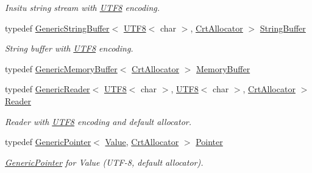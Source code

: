 \begin{DoxyCompactItemize}
\begin{DoxyCompactList}\small\item\em Insitu string stream with \mbox{\hyperlink{structrapidjson_1_1_u_t_f8}{U\+T\+F8}} encoding. \end{DoxyCompactList}\item 
typedef \mbox{\hyperlink{classrapidjson_1_1_generic_string_buffer}{Generic\+String\+Buffer}}$<$ \mbox{\hyperlink{structrapidjson_1_1_u_t_f8}{U\+T\+F8}}$<$ char $>$, \mbox{\hyperlink{classrapidjson_1_1_crt_allocator}{Crt\+Allocator}} $>$ \mbox{\hyperlink{namespacerapidjson_ac0765ea91f41539645c4b78689d03f21}{String\+Buffer}}
\begin{DoxyCompactList}\small\item\em String buffer with \mbox{\hyperlink{structrapidjson_1_1_u_t_f8}{U\+T\+F8}} encoding. \end{DoxyCompactList}\item 
typedef \mbox{\hyperlink{structrapidjson_1_1_generic_memory_buffer}{Generic\+Memory\+Buffer}}$<$ \mbox{\hyperlink{classrapidjson_1_1_crt_allocator}{Crt\+Allocator}} $>$ \mbox{\hyperlink{namespacerapidjson_acb643b9055e7988f4cb89ce4f7e6b115}{Memory\+Buffer}}
\item 
typedef \mbox{\hyperlink{classrapidjson_1_1_generic_reader}{Generic\+Reader}}$<$ \mbox{\hyperlink{structrapidjson_1_1_u_t_f8}{U\+T\+F8}}$<$ char $>$, \mbox{\hyperlink{structrapidjson_1_1_u_t_f8}{U\+T\+F8}}$<$ char $>$, \mbox{\hyperlink{classrapidjson_1_1_crt_allocator}{Crt\+Allocator}} $>$ \mbox{\hyperlink{namespacerapidjson_ad5310edd1226f5b3ea82dc0d4d3740c6}{Reader}}
\begin{DoxyCompactList}\small\item\em Reader with \mbox{\hyperlink{structrapidjson_1_1_u_t_f8}{U\+T\+F8}} encoding and default allocator. \end{DoxyCompactList}\item 
typedef \mbox{\hyperlink{classrapidjson_1_1_generic_pointer}{Generic\+Pointer}}$<$ \mbox{\hyperlink{namespacerapidjson_aa65fc9fb381b2cbc54f98673eadd6505}{Value}}, \mbox{\hyperlink{classrapidjson_1_1_crt_allocator}{Crt\+Allocator}} $>$ \mbox{\hyperlink{namespacerapidjson_a080910f74d2f5046e6724280159cf374}{Pointer}}
\begin{DoxyCompactList}\small\item\em \mbox{\hyperlink{classrapidjson_1_1_generic_pointer}{Generic\+Pointer}} for Value (U\+T\+F-\/8, default allocator). \end{DoxyCompactList}\item 

\end{DoxyCompactItemize}
